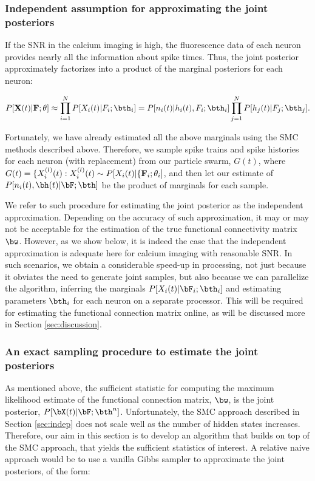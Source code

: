 \subsubsection{Independent assumption for approximating the joint posteriors}

If the SNR in the calcium imaging is high,  the fluorescence data of each neuron provides nearly all the information about spike times.  Thus, the joint posterior approximately factorizes into a product of the marginal posteriors for each neuron:

\begin{equation} \label{eqn:indep_approx}
	P[{\bf X}(t)|{\bf F};\theta]  \approx \prod_{i=1}^N P[X_i(t)|F_i; \bth_i] = P[n_i(t)| h_i(t), F_i; \bth_i] \prod_{j=1}^N P[h_j(t)|F_j; \bth_j]. 
\end{equation}
	
\noindent Fortunately, we have already estimated all the above marginals using the SMC methods described above. Therefore, we sample spike trains and spike histories for each neuron (with replacement) from our particle swarm, $G(t)$, where $G(t)=\{X_i^{(l)}(t):  X_i^{(l)}(t) \sim P[X_i(t)|\{{\bf F}_i;\theta_i]$,  and then let our estimate of $P[n_i(t), \bh(t) | \bF; \bth]$ be the product of marginals for each sample.

We refer to such procedure for estimating the joint posterior as the independent approximation. Depending on the accuracy of such approximation, it may or may not be acceptable for the estimation of the true functional connectivity matrix $\bw$. However, as we show below, it is indeed the case that the independent approximation is adequate here for calcium imaging with reasonable SNR.  In such scenarios, we obtain a considerable speed-up in processing, not just because it obviates the need to generate joint samples, but also because we can parallelize the algorithm, inferring the marginals $P[X_i(t) | \bF_i; \bth_i]$ and estimating parameters $\bth_i$ for each neuron on a separate processor.  This will be required for estimating the functional connection matrix online, as will be discussed more in Section \ref{sec:discussion}.

\subsubsection{An exact sampling procedure to estimate the joint posteriors}

As mentioned above, the sufficient statistic for computing the maximum likelihood estimate of the functional connection matrix, $\bw$, is the joint posterior, $P[\bX(t) | \bF; \bth^n]$.  Unfortunately, the SMC approach described in Section \ref{sec:indep} does not scale well as the number of hidden states increases.  Therefore, our aim in this section is to develop an algorithm that builds on top of the SMC approach, that yields the sufficient statistics of interest.  A relative naive approach would be to use a vanilla Gibbs sampler to approximate the joint posteriors, of the form:

